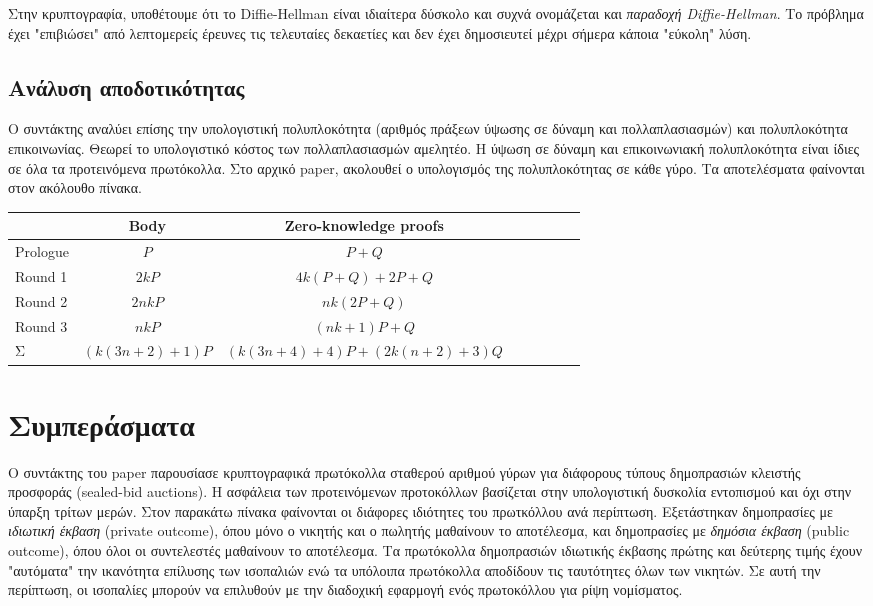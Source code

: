 \documentclass[letterpaper,11pt]{article}
\begin{document}
Στην κρυπτογραφία, υποθέτουμε ότι το Diffie-Hellman είναι ιδιαίτερα δύσκολο και συχνά ονομάζεται και \emph{παραδοχή Diffie-Hellman}. Το πρόβλημα
έχει "επιβιώσει" από λεπτομερείς έρευνες τις τελευταίες δεκαετίες και δεν έχει δημοσιευτεί μέχρι σήμερα κάποια "εύκολη" λύση.

\subsection{Ανάλυση αποδοτικότητας}

Ο συντάκτης αναλύει επίσης την υπολογιστική πολυπλοκότητα (αριθμός πράξεων ύψωσης σε δύναμη και πολλαπλασιασμών) και πολυπλοκότητα επικοινωνίας.
Θεωρεί το υπολογιστικό κόστος των πολλαπλασιασμών αμελητέο. Η ύψωση σε δύναμη και επικοινωνιακή πολυπλοκότητα είναι ίδιες σε όλα τα
προτεινόμενα πρωτόκολλα. Στο αρχικό paper, ακολουθεί ο υπολογισμός της πολυπλοκότητας σε κάθε γύρο. Τα αποτελέσματα φαίνονται στον ακόλουθο πίνακα.

\begin{center}
\begin{tabular}{l*{6}{c}r}
		& Body 	& Zero-knowledge proofs\\
	\hline
	Prologue	& $P$ 				& $P+Q$				\\
	Round 1		& $2kP$				& $4k(P+Q)+2P+Q$	\\
	Round 2		& $2nkP$			& $nk(2P+Q)$		\\
	Round 3		& $nkP$				& $(nk+1)P+Q$		\\
	Σ			& $(k(3n+2)+1)P$	& $(k(3n+4)+4)P+(2k(n+2)+3)Q$\\	
\end{tabular}
\end{center}


\section{Συμπεράσματα} Ο συντάκτης του paper παρουσίασε κρυπτογραφικά πρωτόκολλα σταθερού αριθμού γύρων για διάφορους τύπους δημοπρασιών κλειστής
προσφοράς (sealed-bid auctions). Η ασφάλεια των προτεινόμενων προτοκόλλων βασίζεται στην υπολογιστική δυσκολία εντοπισμού και όχι στην ύπαρξη
τρίτων μερών. Στον παρακάτω πίνακα φαίνονται οι διάφορες ιδιότητες του πρωτκόλλου ανά περίπτωση. Εξετάστηκαν δημοπρασίες με \emph{ιδιωτική έκβαση}
(private outcome), όπου μόνο ο νικητής και ο πωλητής μαθαίνουν το αποτέλεσμα, και δημοπρασίες με \emph{δημόσια έκβαση} (public outcome), όπου όλοι
οι συντελεστές μαθαίνουν το αποτέλεσμα. Τα πρωτόκολλα δημοπρασιών ιδιωτικής έκβασης πρώτης και δεύτερης τιμής έχουν "αυτόματα" την ικανότητα
επίλυσης των ισοπαλιών ενώ τα υπόλοιπα πρωτόκολλα αποδίδουν τις ταυτότητες όλων των νικητών. Σε αυτή την περίπτωση, οι ισοπαλίες μπορούν να
επιλυθούν με την διαδοχική εφαρμογή ενός πρωτοκόλλου για ρίψη νομίσματος.
\end{document}
